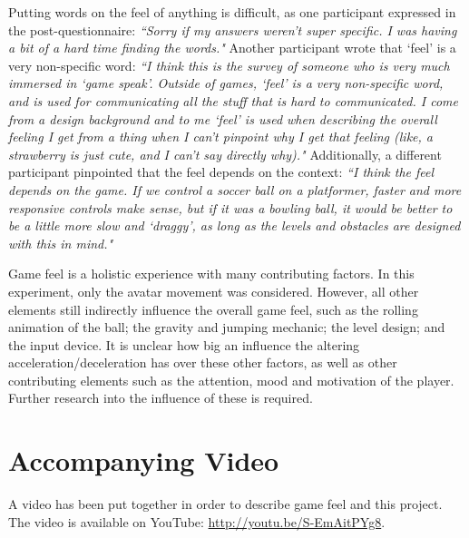 Putting words on the feel of anything is difficult, as one participant expressed in the post-questionnaire: \textit{``Sorry if my answers weren't super specific. I was having a bit of a hard time finding the words."} Another participant wrote that `feel' is a very non-specific word: \textit{``I think this is the survey of someone who is very much immersed in `game speak'. Outside of games, `feel' is a very non-specific word, and is used for communicating all the stuff that is hard to communicated. I come from a design background and to me `feel' is used when describing the overall feeling I get from a thing when I can't pinpoint why I get that feeling (like, a strawberry is just cute, and I can't say directly why)."} Additionally, a different participant pinpointed that the feel depends on the context: \textit{``I think the feel depends on the game. If we control a soccer ball on a platformer, faster and more responsive controls make sense, but if it was a bowling ball, it would be better to be a little more slow and `draggy', as long as the levels and obstacles are designed with this in mind."}

Game feel is a holistic experience with many contributing factors. In this experiment, only the avatar movement was considered. However, all other elements still indirectly influence the overall game feel, such as the rolling animation of the ball; the gravity and jumping mechanic; the level design; and the input device. It is unclear how big an influence the altering acceleration/deceleration has over these other factors, as well as other contributing elements such as the attention, mood and motivation of the player. Further research into the influence of these is required.

\section{Accompanying Video}
A video has been put together in order to describe game feel and this project. The video is available on YouTube: \url{http://youtu.be/S-EmAitPYg8}.